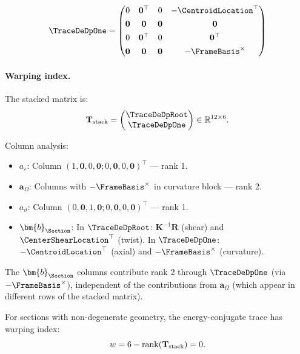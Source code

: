 \begin{equation}
\TraceDeDpOne = \begin{pmatrix}
0 & \mathbf{0}^\top & 0 & -\CentroidLocation^\top \\[4pt]
\mathbf{0} & \mathbf{0} & \mathbf{0} & \mathbf{0} \\[4pt]
0 & \mathbf{0}^\top & 0 & \mathbf{0}^\top \\[4pt]
\mathbf{0} & \mathbf{0} & \mathbf{0} & -\FrameBasis^\times
\end{pmatrix}
\label{eq:T1-romano-final}
\end{equation}

\paragraph{Warping index.}

The stacked matrix is:
\begin{equation}
\mathbf{T}_{\rm stack} = \begin{pmatrix} \TraceDeDpRoot \\ \TraceDeDpOne \end{pmatrix} 
\in \mathbb{R}^{12 \times 6}.
\end{equation}

Column analysis:
\begin{itemize}
\item $a_\varepsilon$: Column $(1, \mathbf{0}, 0, \mathbf{0}; 0, \mathbf{0}, 0, \mathbf{0})^\top$ — rank 1.
\item $\bm{a}_\Omega$: Columns with $-\FrameBasis^\times$ in curvature block — rank 2.
\item $a_\vartheta$: Column $(0, \mathbf{0}, 1, \mathbf{0}; 0, \mathbf{0}, 0, \mathbf{0})^\top$ — rank 1.
\item $\bm{b}_{\Section}$: In $\TraceDeDpRoot$: $\mathbf{K}^{-1}\mathbf{R}$ (shear) and $\CenterShearLocation^\top$ (twist). 
In $\TraceDeDpOne$: $-\CentroidLocation^\top$ (axial) and $-\FrameBasis^\times$ (curvature).
\end{itemize}

The $\bm{b}_{\Section}$ columns contribute rank 2 through $\TraceDeDpOne$ (via $-\FrameBasis^\times$), 
independent of the contributions from $\bm{a}_\Omega$ (which appear in different rows 
of the stacked matrix).

\begin{proposition}
\label{prop:warp-index-romano-final}
For sections with non-degenerate geometry, the energy-conjugate trace has 
warping index:
\begin{equation}
w = 6 - \mathrm{rank}(\mathbf{T}_{\rm stack}) = 0.
\end{equation}
\end{proposition}

